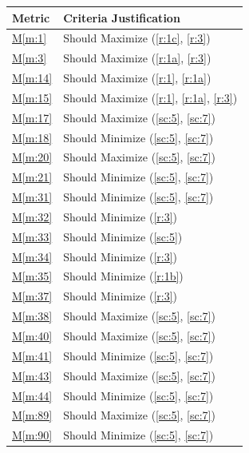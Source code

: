 \documentclass{report}
\newcommand{\mref}[1]{\hyperref[#1]{M\ref{#1}}}
\begin{document}
\begin{tabular}{|l|p{14.35cm}|}
    \hline
    \textbf{Metric} & \textbf{Criteria \hfill Justification} \\
    \hline
    \mref{m:1} & Should Maximize \hfill (\ref{r:1c}, \ref{r:3}) \\
    \hline
    \mref{m:3} & Should Maximize \hfill (\ref{r:1a}, \ref{r:3}) \\
    \hline
    \mref{m:14} & Should Maximize \hfill (\ref{r:1}, \ref{r:1a}) \\
    \hline
    \mref{m:15} & Should Maximize \hfill (\ref{r:1}, \ref{r:1a}, \ref{r:3}) \\
    \hline
    \mref{m:17} & Should Maximize \hfill (\ref{sc:5}, \ref{sc:7}) \\
    \hline
    \mref{m:18} & Should Minimize \hfill (\ref{sc:5}, \ref{sc:7}) \\
    \hline
    \mref{m:20} & Should Maximize \hfill (\ref{sc:5}, \ref{sc:7}) \\
    \hline
    \mref{m:21} & Should Minimize \hfill (\ref{sc:5}, \ref{sc:7}) \\
    \hline
    \mref{m:31} & Should Minimize \hfill (\ref{sc:5}, \ref{sc:7}) \\
    \hline
    \mref{m:32} & Should Minimize \hfill (\ref{r:3}) \\
    \hline
    \mref{m:33} & Should Minimize \hfill (\ref{sc:5}) \\
    \hline
    \mref{m:34} & Should Minimize \hfill (\ref{r:3}) \\
    \hline
    \mref{m:35} & Should Minimize \hfill (\ref{r:1b}) \\
    \hline
    \mref{m:37} & Should Minimize \hfill (\ref{r:3}) \\
    \hline
    \mref{m:38} & Should Maximize \hfill (\ref{sc:5}, \ref{sc:7}) \\
    \hline
    \mref{m:40} & Should Maximize \hfill (\ref{sc:5}, \ref{sc:7}) \\
    \hline
    \mref{m:41} & Should Minimize \hfill (\ref{sc:5}, \ref{sc:7}) \\
    \hline
    \mref{m:43} & Should Maximize \hfill (\ref{sc:5}, \ref{sc:7}) \\
    \hline
    \mref{m:44} & Should Minimize \hfill (\ref{sc:5}, \ref{sc:7}) \\
    \hline
    \mref{m:89} & Should Maximize \hfill (\ref{sc:5}, \ref{sc:7}) \\
    \hline
    \mref{m:90} & Should Minimize \hfill (\ref{sc:5}, \ref{sc:7}) \\

\end{tabular}
\end{document}

